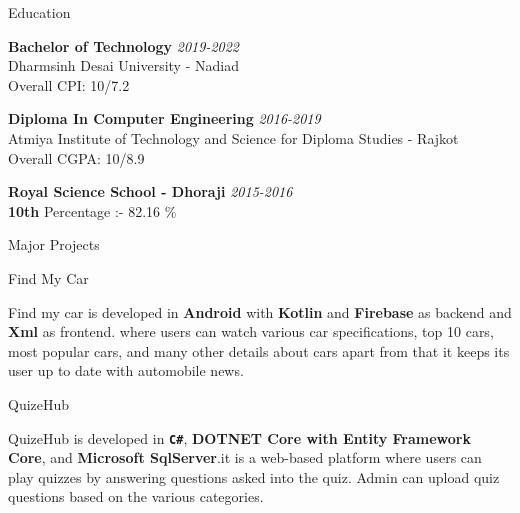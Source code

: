 \documentclass{resume} %
\begin{document}

\begin{rSection}{Education} 

{\bf Bachelor of Technology} \hfill {\em 2019-2022} \\ 
Dharmsinh Desai University - Nadiad \smallskip \\
Overall CPI:  10/7.2

{\bf Diploma In Computer Engineering} \hfill {\em 2016-2019} \\ 
Atmiya Institute of Technology and Science for Diploma Studies - Rajkot \smallskip \\
Overall CGPA: 10/8.9

{\bf Royal Science School - Dhoraji} \hfill {\em 2015-2016} \\ 
\textbf{10th} Percentage :- 82.16 \% 

\end{rSection}


\begin{rSection}{Major Projects}

\begin{rSubsection}{Find My Car}{}{}{}
\item Find my car is developed in \textbf{Android} with \textbf{Kotlin} and \textbf{Firebase} as backend and \textbf{Xml} as frontend. where users can watch various car specifications, top 10 cars, most popular cars, and many other details about cars apart from that it keeps its user up to date with automobile news.
\end{rSubsection}


\begin{rSubsection}{QuizeHub}{}{}{}
\item QuizeHub is developed in \textbf{\texttt{C\#}}, \textbf{DOTNET Core with Entity Framework Core}, and \textbf{Microsoft SqlServer}.it is a web-based platform where users can play quizzes by answering questions asked into the quiz. Admin can upload quiz questions based on the various categories. 
\end{rSubsection}

\end{rSection}
\end{document}
